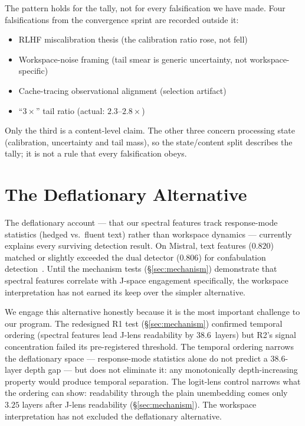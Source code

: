 \documentclass[11pt,a4paper]{article}
\begin{document}
The pattern holds for the tally, not for every falsification we have
made. Four falsifications from the convergence sprint are recorded
outside it:
\begin{itemize}[nosep]
\item RLHF miscalibration thesis (the calibration ratio rose, not
  fell)
\item Workspace-noise framing (tail smear is generic uncertainty,
  not workspace-specific)
\item Cache-tracing observational alignment (selection artifact)
\item ``$3\times$'' tail ratio (actual: $2.3$--$2.8\times$)
\end{itemize}
Only the third is a content-level claim. The other three concern
processing state (calibration, uncertainty and tail mass), so the
state/content split describes the tally; it is not a rule that every
falsification obeys.

\section{The Deflationary Alternative}
\label{sec:deflationary}

The deflationary account --- that our spectral features track response-mode
statistics (hedged vs.\ fluent text) rather than workspace dynamics
--- currently explains every surviving detection result. On Mistral,
text features ($0.820$) matched or slightly exceeded the dual detector
($0.806$) for confabulation detection~\citep{lyra2026dualdetector}. Until the mechanism tests
(\S\ref{sec:mechanism}) demonstrate that spectral features correlate
with J-space engagement specifically, the workspace interpretation
has not earned its keep over the simpler alternative.

We engage this alternative honestly because it is the most important
challenge to our program. The redesigned R1 test
(\S\ref{sec:mechanism}) confirmed temporal ordering (spectral
features lead J-lens readability by 38.6~layers) but R2's signal
concentration failed its pre-registered threshold. The temporal
ordering narrows the deflationary space --- response-mode statistics
alone do not predict a 38.6-layer depth gap --- but does not eliminate
it: any monotonically depth-increasing property would produce
temporal separation. The logit-lens control narrows what the ordering
can show: readability through the plain unembedding comes only
$3.25$ layers after J-lens readability (\S\ref{sec:mechanism}). The
workspace interpretation has not excluded the deflationary alternative.
\end{document}
